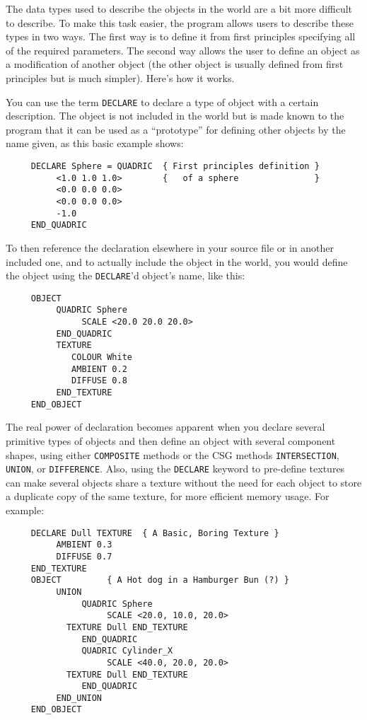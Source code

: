 The data types used to describe the objects in the world are a bit more
difficult to describe.  To make this task easier, the program allows users to
describe these types in two ways.  The first way is to define it from first
principles specifying all of the required parameters.  The second way allows
the user to define an object as a modification of another object (the other
object is usually defined from first principles but is much simpler).  Here's
how it works.

You can use the term {\tt DECLARE} to declare a type of object with a
certain description.
The object is not included in the world but is
made known to the program that it can be used as a ``prototype'' for
defining other objects by the name given, as this basic example shows:
\begin{verbatim}
     DECLARE Sphere = QUADRIC  { First principles definition }
          <1.0 1.0 1.0>        {   of a sphere               }
          <0.0 0.0 0.0>
          <0.0 0.0 0.0>
          -1.0
     END_QUADRIC
\end{verbatim}
To then reference the declaration elsewhere in your source file or in another
included one, and to actually include the object in the world, you would
define the object using the {\tt DECLARE}'d object's name, like this:
\begin{verbatim}
     OBJECT
          QUADRIC Sphere
               SCALE <20.0 20.0 20.0>
          END_QUADRIC
          TEXTURE
             COLOUR White
             AMBIENT 0.2
             DIFFUSE 0.8
          END_TEXTURE
     END_OBJECT
\end{verbatim}

The real power of declaration becomes apparent when you declare
several primitive types of objects and then define an object with
several component shapes, using either {\tt COMPOSITE} methods or the
CSG methods {\tt INTERSECTION}, {\tt UNION}, or {\tt DIFFERENCE}.
Also, using the {\tt DECLARE} keyword to pre-define textures can make
several objects share a texture without the need for each object to
store a duplicate copy of the same texture, for more efficient memory
usage.
For example:
\begin{verbatim}
     DECLARE Dull TEXTURE  { A Basic, Boring Texture }
          AMBIENT 0.3
          DIFFUSE 0.7
     END_TEXTURE
     OBJECT         { A Hot dog in a Hamburger Bun (?) }
          UNION
               QUADRIC Sphere
                    SCALE <20.0, 10.0, 20.0>
            TEXTURE Dull END_TEXTURE
               END_QUADRIC
               QUADRIC Cylinder_X
                    SCALE <40.0, 20.0, 20.0>
            TEXTURE Dull END_TEXTURE
               END_QUADRIC
          END_UNION
     END_OBJECT
\end{verbatim}

